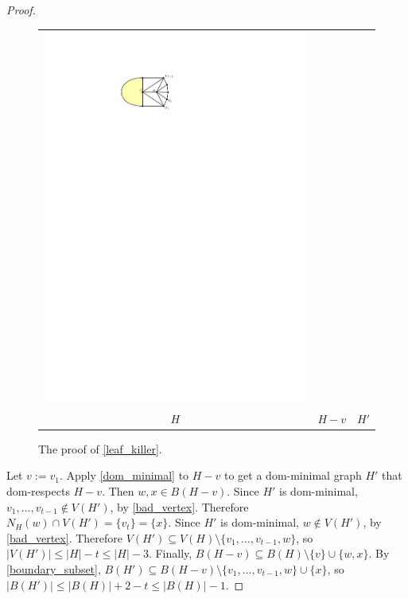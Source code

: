 \documentclass{article}
\theoremstyle{definition}
\begin{document}
\begin{proof}
\begin{figure}[htbp]
\begin{tabular}{ccc}
      \includegraphics[page=3]{figs/killing_a_leaf} \\
      $H$ & $H-v$ & $H'$
    \end{tabular}
    \caption{The proof of \cref{leaf_killer}.}
    \label{killing_a_leaf}
  \end{figure}

  Let $v:=v_1$. Apply \cref{dom_minimal} to $H-v$ to get a dom-minimal graph $H'$ that dom-respects $H-v$.  Then $w,x\in B(H-v)$.  Since $H'$ is dom-minimal, $v_1,\ldots,v_{t-1}\not\in V(H')$, by \cref{bad_vertex}.  Therefore $N_H(w)\cap V(H')=\{v_t\}=\{x\}$. Since $H'$ is dom-minimal, $w\not\in V(H')$, by \cref{bad_vertex}. Therefore $V(H')\subseteq V(H)\setminus\{v_1,\ldots,v_{t-1},w\}$, so $|V(H')|\le |H|-t\le |H|-3$.  Finally, $B(H-v)\subseteq B(H)\setminus \{v\}\cup\{w,x\}$. By \cref{boundary_subset}, $B(H')\subseteq B(H-v)\setminus\{v_1,\ldots,v_{t-1},w\}\cup\{x\}$, so $|B(H')|\le |B(H)|+2-t\le |B(H)|-1$.
\end{proof}
\end{document}
